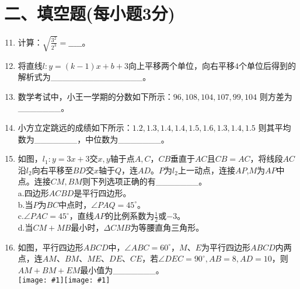 \documentclass[10pt]{article}
\newcommand{\smallpicture}[2]{\texttt{[image: \#1]}}
\begin{document}
\section*{\normalsize 二、填空题(每小题3分)}
\begin{enumerate}\setcounter{enumi}{10}
    \item 计算：$\sqrt{\frac{3^2}{2^3}}=\_\_\_\_\_$。
    \item 将直线$l:y=(k-1)x+b+3$向上平移两个单位，向右平移$4$个单位后得到的解析式为\_\_\_\_\_\_\_\_\_\_\_\_\_\_\_。
    \item 数学考试中，小王一学期的分数如下所示：$96,108,104,107,99,104$ 则方差为\_\_\_\_\_\_\_。
    \item 小方立定跳远的成绩如下所示：$1.2,1.3,1.4,1.4,1.5,1.6,1.3,1.4,1.5$ 则其平均数为\_\_\_\_\_\_\_，中位数为\_\_\_\_\_\_\_。
    \item 如图，$l_1:y=3x+3$交$x,y$轴于点$A,C$，$CB$垂直于$AC$且$CB=AC$，将线段$AC$沿$l_2$向右平移至$BD$交$x$轴于$Q$，连$AD$。$P$为$l_2$上一动点，连接$AP$,$M$为$AP$中点。连接$CM,BM$则下列选项正确的有\_\_\_\_\_\_\_。\\
    a.四边形$ACBD$是平行四边形。\\
    b.当$P$为$BC$中点时，$\angle PAQ=45^\circ$。\\
    c.$\angle PAC=45^\circ$，直线$AP$的比例系数为$\frac{1}{2}$或$-3$。\\
    d.当$CM+MB$最小时，$\Delta CMB$为等腰直角三角形。
    \item 如图，平行四边形$ABCD$中，$\angle ABC=60^\circ$，$M$、$E$为平行四边形$ABCD$内两点，连$AM$、$BM$、$ME$、$DE$、$CE$，若$\angle DEC=90^\circ,AB=8,AD=10$，则$AM+BM+EM$最小值为\_\_\_\_\_\_\_。\\
    \smallpicture{T15}{0.15}\smallpicture{T16}{0.5}
\end{enumerate}
\end{document}
